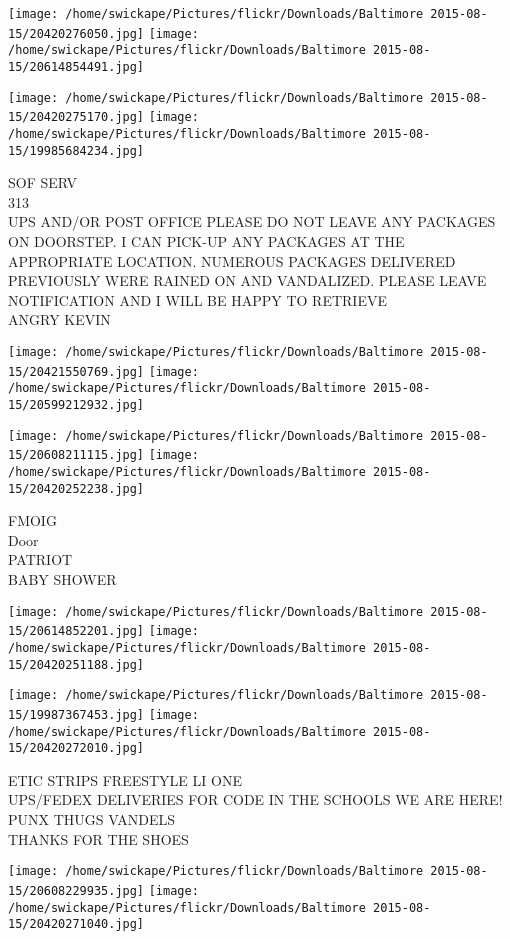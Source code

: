 \documentclass[10pt,letterpaper]{article}
\begin{document}
\texttt{[image: /home/swickape/Pictures/flickr/Downloads/Baltimore 2015-08-15/20420276050.jpg]}
\texttt{[image: /home/swickape/Pictures/flickr/Downloads/Baltimore 2015-08-15/20614854491.jpg]}

\texttt{[image: /home/swickape/Pictures/flickr/Downloads/Baltimore 2015-08-15/20420275170.jpg]}
\texttt{[image: /home/swickape/Pictures/flickr/Downloads/Baltimore 2015-08-15/19985684234.jpg]}

SOF SERV\\
313\\
UPS AND/OR POST OFFICE PLEASE DO NOT LEAVE ANY PACKAGES ON DOORSTEP.  I CAN PICK{-}UP ANY PACKAGES AT THE APPROPRIATE LOCATION.  NUMEROUS PACKAGES DELIVERED PREVIOUSLY WERE RAINED ON AND VANDALIZED.  PLEASE LEAVE NOTIFICATION AND I WILL BE HAPPY TO RETRIEVE\\
ANGRY KEVIN
\pagebreak

\texttt{[image: /home/swickape/Pictures/flickr/Downloads/Baltimore 2015-08-15/20421550769.jpg]}
\texttt{[image: /home/swickape/Pictures/flickr/Downloads/Baltimore 2015-08-15/20599212932.jpg]}

\texttt{[image: /home/swickape/Pictures/flickr/Downloads/Baltimore 2015-08-15/20608211115.jpg]}
\texttt{[image: /home/swickape/Pictures/flickr/Downloads/Baltimore 2015-08-15/20420252238.jpg]}

FMOIG\\
Door\\
PATRIOT\\
BABY SHOWER
\pagebreak

\texttt{[image: /home/swickape/Pictures/flickr/Downloads/Baltimore 2015-08-15/20614852201.jpg]}
\texttt{[image: /home/swickape/Pictures/flickr/Downloads/Baltimore 2015-08-15/20420251188.jpg]}

\texttt{[image: /home/swickape/Pictures/flickr/Downloads/Baltimore 2015-08-15/19987367453.jpg]}
\texttt{[image: /home/swickape/Pictures/flickr/Downloads/Baltimore 2015-08-15/20420272010.jpg]}

ETIC STRIPS FREESTYLE LI ONE\\
UPS/FEDEX DELIVERIES FOR CODE IN THE SCHOOLS WE ARE HERE!\\
PUNX THUGS VANDELS\\
THANKS FOR THE SHOES
\pagebreak

\texttt{[image: /home/swickape/Pictures/flickr/Downloads/Baltimore 2015-08-15/20608229935.jpg]}
\texttt{[image: /home/swickape/Pictures/flickr/Downloads/Baltimore 2015-08-15/20420271040.jpg]}
\end{document}
